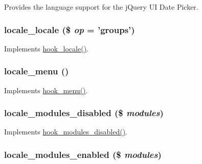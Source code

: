 Provides the language support for the jQuery UI Date Picker. \hypertarget{locale_8module_ae83939a2d21f63a468411f16d58eab5c}{
\subsubsection[{locale\_\-locale}]{\setlength{\rightskip}{0pt plus 5cm}locale\_\-locale (\$ {\em op} = {\ttfamily 'groups'})}}
\label{locale_8module_ae83939a2d21f63a468411f16d58eab5c}
Implements \hyperlink{group__hooks_ga7d8968676deb891e4838c2d3173de7f6}{hook\_\-locale()}. \hypertarget{locale_8module_ad9b4de796140412563ad0aee2b051d3d}{
\subsubsection[{locale\_\-menu}]{\setlength{\rightskip}{0pt plus 5cm}locale\_\-menu ()}}
\label{locale_8module_ad9b4de796140412563ad0aee2b051d3d}
Implements \hyperlink{group__hooks_ga5c95244fea59b25666e409759e133ded}{hook\_\-menu()}. \hypertarget{locale_8module_ac749e1e9a3ba377a1620db71f9e43ae0}{
\subsubsection[{locale\_\-modules\_\-disabled}]{\setlength{\rightskip}{0pt plus 5cm}locale\_\-modules\_\-disabled (\$ {\em modules})}}
\label{locale_8module_ac749e1e9a3ba377a1620db71f9e43ae0}
Implements \hyperlink{group__hooks_ga591c577fba8ca8dc8ec17f8bf80bdc4c}{hook\_\-modules\_\-disabled()}. \hypertarget{locale_8module_ad50d372fc041d4058cb1e46de2b25ae8}{
\subsubsection[{locale\_\-modules\_\-enabled}]{\setlength{\rightskip}{0pt plus 5cm}locale\_\-modules\_\-enabled (\$ {\em modules})}}
\label{locale_8module_ad50d372fc041d4058cb1e46de2b25ae8}
